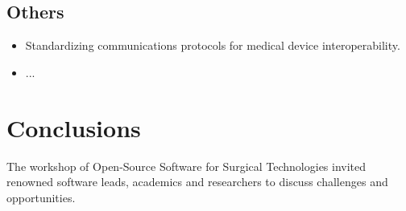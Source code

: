 \documentclass{article}
\begin{document}
\subsection{Others}
\begin{itemize}
    \item Standardizing communications protocols for medical device interoperability. 
    \item ...
\end{itemize}



\section{Conclusions}
The workshop of Open-Source Software for Surgical Technologies invited renowned software leads, academics and researchers to discuss challenges and opportunities. 





% 

\end{document}
